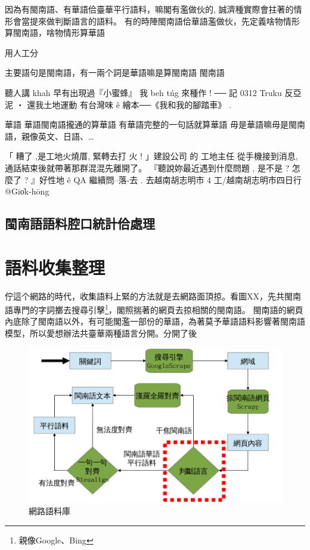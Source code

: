 因為有閩南語、有華語佮臺華平行語料，嘛閣有濫做伙的, 誠濟種實際會拄著的情形會當提來做判斷語言的語料。
有的時陣閩南語佮華語濫做伙，先定義啥物情形算閩南語，啥物情形算華語

用人工分

主要語句是閩南語，有一兩个詞是華語嘛是算閩南語
閩南語

聽人講 khah 早有出現過『小蜜蜂』
我 beh tńg 來種作 ! ── 記 0312 Truku 反亞泥 ‧ 還我土地運動
有台灣味 ê 繪本──《我和我的腳踏車》 .

華語
華語閩南語攏通的算華語
有華語完整的一句話就算華語
毋是華語嘛毋是閩南語，親像英文、日語、…

「 糟了 ,是工地火燒厝, 緊轉去打 火 ! 」建設公司 的 工地主任 從手機接到消息,通話結束後就帶著那群混混先離開了。
『聽說妳最近遇到什麼問題 , 是不是 ? 怎麼了 ? 』好性地 ê QA 繼續問--落-去 .
去越南胡志明市 4 工/越南胡志明市四日行 @Gio̍k-hōng

\subsection{閩南語語料腔口統計佮處理}
\label{小節：閩南語語料腔口統計佮處理}

\section{語料收集整理}
\label{節：語料收集整理}
佇這个網路的時代，收集語料上緊的方法就是去網路面頂掠。看圖XX，先共閩南語專門的字詞擲去搜尋引擊\footnote{親像Google、Bing}，閣照揣著的網頁去掠相關的閩南語。
閩南語的網頁內底除了閩南語以外，有可能閣濫一部份的華語，為著莫予華語語料影響著閩南語模型，所以愛想辦法共臺華兩種語言分開。分開了後


\begin{figure}
\centerline{\includegraphics[keepaspectratio]{圖/網路語料庫結構}}
\caption{網路語料庫}
\label{圖：網路語料庫結構}
\end{figure}

